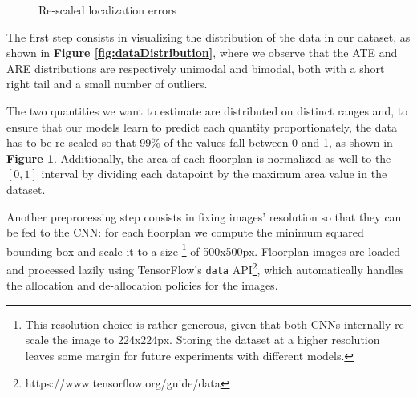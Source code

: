 \begin{figure}[ht!]
    \centering
    \caption{Re-scaled localization errors}\label{fig:dataDistribution_scaled}
\end{figure}

\noindent
The first step consists in visualizing the distribution of the data in our dataset, as shown in \textbf{Figure \ref{fig:dataDistribution}}, where we observe that the ATE and ARE distributions are respectively unimodal and bimodal, both with a short right tail and a small number of outliers.

The two quantities we want to estimate are distributed on distinct ranges and, to ensure that our models learn to predict each quantity proportionately, the data has to be re-scaled so that 99\% of the values fall between 0 and 1, as shown in \textbf{Figure \ref{fig:dataDistribution_scaled}}. Additionally, the area of each floorplan is normalized as well to the $[0, 1]$ interval by dividing each datapoint by the maximum area value in the dataset.


\noindent
Another preprocessing step consists in fixing images' resolution so that they can be fed to the CNN: for each floorplan we compute the minimum squared bounding box and scale it to a size \footnote{This resolution choice is rather generous, given that both CNNs internally re-scale the image to 224x224px. Storing the dataset at a higher resolution leaves some margin for future experiments with different models.} of 500x500px. 
Floorplan images are loaded and processed lazily using TensorFlow's \texttt{data} API\footnote{https://www.tensorflow.org/guide/data}, which automatically handles the allocation and de-allocation policies for the images. 

